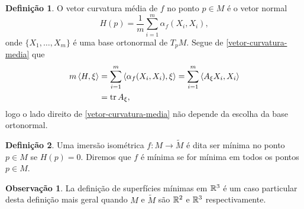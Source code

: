 \documentclass[12pt,a4paper]{beamer}
\theoremstyle{definition}
\newtheorem{definicao}{Definição}
\newtheorem{observacao}{Observação}
\begin{document}
\begin{frame}

	\begin{definicao}
		O \alert{vetor curvatura média} de $f$ no ponto $p \in M$ é o vetor normal
		\begin{equation}\label{vetor-curvatura-media}
		H(p) = \frac{1}{m} \sum_{i=1}^m \alpha_f(X_i,X_i),
		\end{equation}
		onde $\{X_1, \ldots, X_m \}$ é uma base ortonormal de $T_p M$. Segue de \eqref{vetor-curvatura-media} que
		\begin{align*}
		m \left\langle H,\xi \right\rangle &= \sum_{i=1}^m \left\langle \alpha_f(X_i,X_i),\xi \right\rangle = \sum_{i=1}^m \left\langle A_{\xi} X_i,X_i \right\rangle\\
		&= \operatorname{tr} A_{\xi},
		\end{align*}
		logo o lado direito de \eqref{vetor-curvatura-media} não depende da escolha da base ortonormal.
	\end{definicao}

\end{frame}

\begin{frame}

	\begin{definicao}
		Uma imersão isométrica $f: M \rightarrow \tilde{M}$ é dita ser \alert{mínima} no ponto $p \in M$ se $H(p)=0$. Diremos que $f$ é \alert{mínima} se for mínima em todos os pontos $p \in M$.
	\end{definicao}

	\pause

	\begin{observacao}
		La definição de superfícies mínimas em $\mathbb R^3$ é \alert{um caso particular} desta definição mais geral quando $M$ e $\tilde{M}$ são $\mathbb R^2$ e $\mathbb R^3$ respectivamente.
	\end{observacao}
\end{frame}
\end{document}
